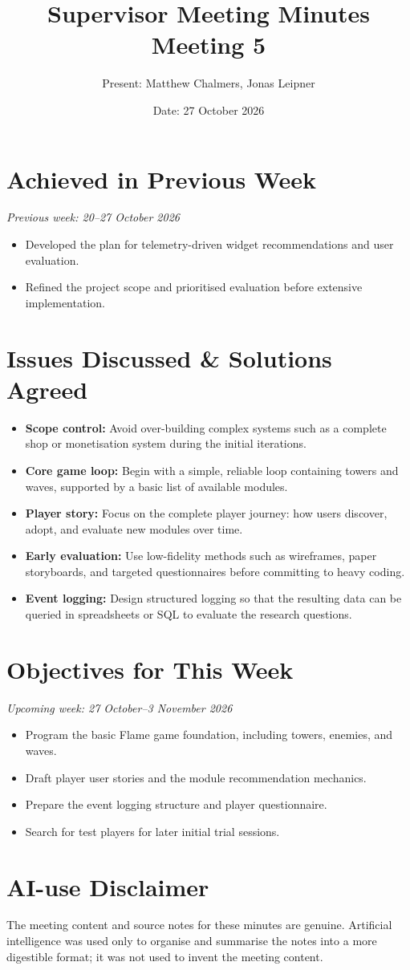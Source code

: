 \documentclass[12pt,a4paper]{article}
\title{\textbf{Supervisor Meeting Minutes}\\Meeting 5}
\author{Present: Matthew Chalmers, Jonas Leipner}
\date{Date: 27 October 2026}
\begin{document}
\maketitle

\section{Achieved in Previous Week}

\noindent\textit{Previous week: 20--27 October 2026}
\begin{itemize}[leftmargin=*]
    \item Developed the plan for telemetry-driven widget recommendations and user evaluation.
    \item Refined the project scope and prioritised evaluation before extensive implementation.
\end{itemize}

\section{Issues Discussed \& Solutions Agreed}

\begin{itemize}[leftmargin=*]
    \item \textbf{Scope control:} Avoid over-building complex systems such as a complete shop or monetisation system during the initial iterations.
    \item \textbf{Core game loop:} Begin with a simple, reliable loop containing towers and waves, supported by a basic list of available modules.
    \item \textbf{Player story:} Focus on the complete player journey: how users discover, adopt, and evaluate new modules over time.
    \item \textbf{Early evaluation:} Use low-fidelity methods such as wireframes, paper storyboards, and targeted questionnaires before committing to heavy coding.
    \item \textbf{Event logging:} Design structured logging so that the resulting data can be queried in spreadsheets or SQL to evaluate the research questions.
\end{itemize}

\section{Objectives for This Week}

\noindent\textit{Upcoming week: 27 October--3 November 2026}
\begin{itemize}[leftmargin=*]
    \item Program the basic Flame game foundation, including towers, enemies, and waves.
    \item Draft player user stories and the module recommendation mechanics.
    \item Prepare the event logging structure and player questionnaire.
    \item Search for test players for later initial trial sessions.
\end{itemize}

\section*{\small AI-use Disclaimer}
\small The meeting content and source notes for these minutes are genuine. Artificial intelligence was used only to organise and summarise the notes into a more digestible format; it was not used to invent the meeting content.
\end{document}
